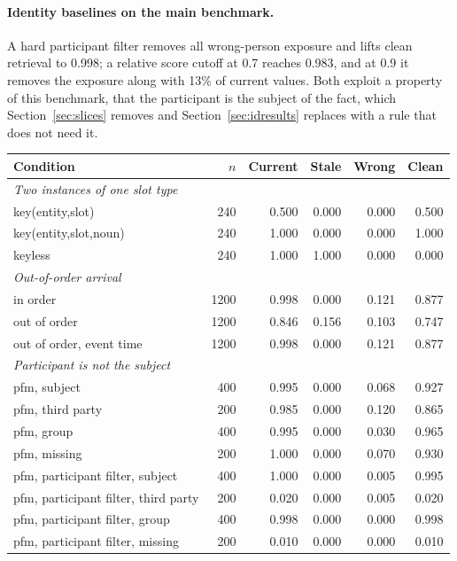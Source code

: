 \documentclass{article} %
\begin{document}
\paragraph{Identity baselines on the main benchmark.} A hard participant filter removes all wrong-person exposure and lifts clean retrieval to 0.998; a relative score cutoff at 0.7 reaches 0.983, and at 0.9 it removes the exposure along with 13\% of current values. Both exploit a property of this benchmark, that the participant is the subject of the fact, which Section~\ref{sec:slices} removes and Section~\ref{sec:idresults} replaces with a rule that does not need it.

\begin{table}[h]
\centering
\scriptsize
\setlength{\tabcolsep}{4pt}
\begin{tabular}{@{}lrrrrr@{}}
\toprule
Condition & $n$ & Current & Stale & Wrong & Clean \\
\midrule
\emph{Two instances of one slot type} &  &  &  &  &  \\
key(entity,slot) & 240 & 0.500 & 0.000 & 0.000 & 0.500 \\
key(entity,slot,noun) & 240 & 1.000 & 0.000 & 0.000 & 1.000 \\
keyless & 240 & 1.000 & 1.000 & 0.000 & 0.000 \\
\midrule
\emph{Out-of-order arrival} &  &  &  &  &  \\
in order & 1200 & 0.998 & 0.000 & 0.121 & 0.877 \\
out of order & 1200 & 0.846 & 0.156 & 0.103 & 0.747 \\
out of order, event time & 1200 & 0.998 & 0.000 & 0.121 & 0.877 \\
\midrule
\emph{Participant is not the subject} &  &  &  &  &  \\
pfm, subject & 400 & 0.995 & 0.000 & 0.068 & 0.927 \\
pfm, third party & 200 & 0.985 & 0.000 & 0.120 & 0.865 \\
pfm, group & 400 & 0.995 & 0.000 & 0.030 & 0.965 \\
pfm, missing & 200 & 1.000 & 0.000 & 0.070 & 0.930 \\
pfm, participant filter, subject & 400 & 1.000 & 0.000 & 0.005 & 0.995 \\
pfm, participant filter, third party & 200 & 0.020 & 0.000 & 0.005 & 0.020 \\
pfm, participant filter, group & 400 & 0.998 & 0.000 & 0.000 & 0.998 \\
pfm, participant filter, missing & 200 & 0.010 & 0.000 & 0.000 & 0.010 \\

\end{tabular}
\end{table}
\end{document}

